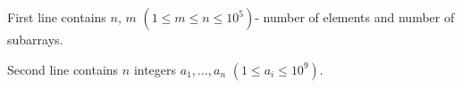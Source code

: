 First line contains $n$, $m$ $(1\le m \le n \le 10^5) $- number of elements and number of subarrays.

Second line contains $n$ integers $a_1, \dots,a_n$ $(1\le a_i \le 10^9) $.
